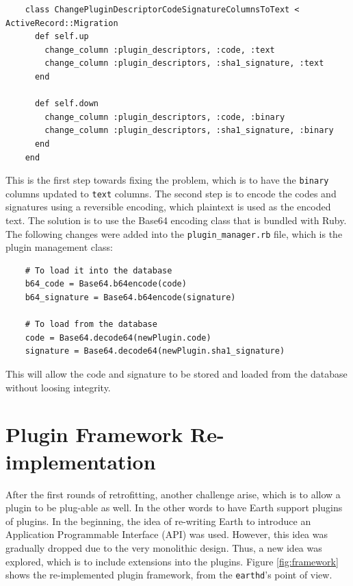 \documentclass{article}
\begin{document}
\begin{verbatim}
    class ChangePluginDescriptorCodeSignatureColumnsToText < ActiveRecord::Migration
      def self.up
        change_column :plugin_descriptors, :code, :text
        change_column :plugin_descriptors, :sha1_signature, :text
      end

      def self.down
        change_column :plugin_descriptors, :code, :binary
        change_column :plugin_descriptors, :sha1_signature, :binary
      end
    end
\end{verbatim}

This is the first step towards fixing the problem, which is to have the \texttt{binary} columns updated to \texttt{text} columns. The second step is to encode the codes and signatures using a reversible encoding, which plaintext is used as the encoded text. The solution is to use the Base64 encoding class that is bundled with Ruby. The following changes were added into the \texttt{plugin\_manager.rb} file, which is the plugin management class:

\begin{verbatim}
    # To load it into the database
    b64_code = Base64.b64encode(code)
    b64_signature = Base64.b64encode(signature)
    
    # To load from the database
    code = Base64.decode64(newPlugin.code)
    signature = Base64.decode64(newPlugin.sha1_signature)
\end{verbatim}

This will allow the code and signature to be stored and loaded from the database without loosing integrity. 


\section{Plugin Framework Re-implementation} %
\label{sec:plugin_framework_re-implementation}

After the first rounds of retrofitting, another challenge arise, which is to allow a plugin to be plug-able as well. In the other words to have Earth support plugins of plugins. In the beginning, the idea of re-writing Earth to introduce an Application Programmable Interface (API) was used. However, this idea was gradually dropped due to the very monolithic design. Thus, a new idea was explored, which is to include extensions into the plugins. Figure \ref{fig:framework} shows the re-implemented plugin framework, from the \texttt{earthd}'s point of view. 
\end{document}
